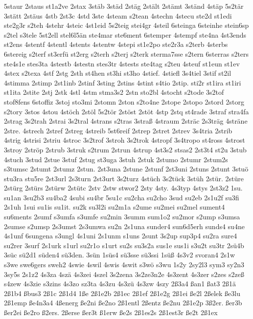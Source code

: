 {5staur
2staus
st1a2ve
2stax
3stäb
3städ
2stäg
2stält
2stämt
3ständ
4stäp
5s2tär
3stätt
2stäus
4stb
2st3c
4std
3ste
4steam
s2tean
4stechn
4stecu
ste2d
st1edi
ste2g3r
s2teh
4stehr
4steic
4st1eid
5s2teig
stei4gr
4steil
6steinga
6steinhe
stein6sp
s2tel
s3tele
5st2ell
stel6l5än
ste4mar
ste6ment
6stemper
4stempf
ste4na
4st3ends
st2ens
4stentf
4stentl
4stents
4stentw
4stepi
st1e2po
ste2r3a
s2terb
4sterbs
6stereig
s2terf
st3erfü
st2erg
s2terh
s2terj
s2terk
sterma7sse
s2tern
6sterras
s2ters
ste4s1e
stes3ta
4stestb
4stestn
stes3tr
4stests
ste4tag
s2teu
4steuf
st1eun
st1ev
4stex
s2texa
4stf
2stg
2sth
st4hen
st3hi
st3ho
4stief.
4stiefl
3s4tiel
3stif
st2il
4stimma
2stimp
2st1inb
2stinf
3sting
2stins
4stint
s4tio
2stip.
sti2r
st1ira
st1iri
st1ita
2stite
2stj
2stk
4stl
4stm
stma3s2
2stn
sto2bl
4stocht
s2tode
3s2tof
stof8fens
6stoffiz
3stoj
sto3mi
2stomn
2ston
s2to4ne
2stope
2stopo
2stord
2storg
s2tory
3stos
4stou
4stöch
2stöl
5s2tör
2stöst
2stöt
4stp
2stq
st4rade
3straf
stra4fa
2strag
3s2trah
2strai
3s2tral
4strans
s2tras
3straß
4straum
2sträc
2s3träg
4sträne
2stre.
4strech
2stref
2streg
4streib
5st6reif
2strep
2stret
2strev
3s4tria
2strib
4strig
4strisi
2striu
4stroc
3s2trof
3stroh
3s2trok
4stropf
3s4tropo
st4ross
4strost
3stroy
2ströp
2strub
3struk
s2trum
2strun
4strup
4st3s2
stsas2
2st3t4
st2u
3stub
4stuch
3stud
2stue
3stuf
2stug
st3uga
3stuh
2stuk
2stumo
2stumr
2stum2s
s3tumsc
2stumt
2stumz
2stun.
2st3una
2stune
2stunf
2st3uni
2stuns
2stunt
3stuö
stu3ra
stu5re
2st3url
2s3turn
2st3urt
3s2turz
4stüch
3s2tück
3stüh
2stür.
2stüre
2stürg
2stürs
2stürw
2stütc
2stv
2stw
stwor2
2sty
4sty.
4s3typ
4stys
2st3z2
1su.
su1an
3su2b3
su4ba2
4subi
su4br
5su1c
su2cha
su2cho
3sud
su2eb
2s1u2f
su3fi
2s1uh
1sui
su1is
su1it.
su2k
su3l2i
su2m1a
s2ume
su2mei
su2mel
sument4
su6ments
2sumf
s3umfa
s3umfe
su2min
3summ
sum1o2
su2mor
s2ump
s3umsa
2sumse
s2umsp
2s3umst
2s3umwa
su2n
2s1una
sunder4
sun6d5erh
sunds4
su4ne
4s1unf
6sungena
s3ungl
4s1uni
2s1unm
s1uns
2sunt
3s2up
sup3p4
su2ra
sure4
su2rer
3surf
2s1urk
s1url
su2r1o
s1urt
su2s
su3s2a
sus1e
sus1i
s3u2t
su3tr
2sü4b
3süc
sü2d1
süden4
sü3den.
3sün
1süs4
sü3sse
sü3ssi
1süß
4s3v2
svoran4
2s1w
s3we
swe6gers
sweh2
4swie
4swil
4swis
4swit
s3wö
s3wu
1s2y
2sy2l3
sym3
sy2n3
3sy5s
2s1z2
4s3za
4szä
4s3zei
4szel
3s2zena
3s2ze3n2e
4s3zent
4s3zer
s2zes
s2zeß
s4zew
4s3zie
s3zins
4s3zo
sz3ta
4s3zu
4s3zü
4s3zw
4szy
2ß3a4
ßan1
ßat3
2ß1ä
2ß1b4
ßbus3
2ß1c
2ß1d4
1ße
2ß1e2b
2ß1ec
2ß1ef
2ß1e2g
2ß1ei
ße2l
2ßelek
ße3lu
2ß1emp
ße4n3a4
4ßenerg
ße2ni
ße2no
2ß1entl
2ßentz
ße2nu
2ß1e2p
3ß2er.
ßer3b
ßer2ei
ße2ro
ß2ers.
2ßerse
ßer3t
ß1erw
ße2s
2ß1es2s
2ß1est3r
ße2t
2ß1ex
}

